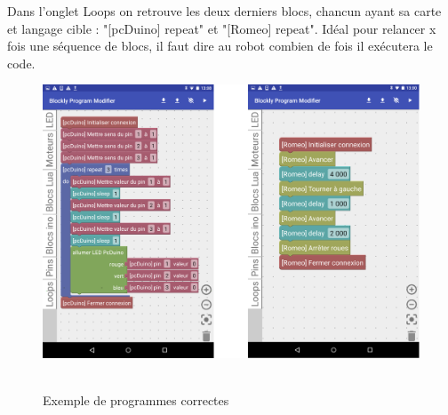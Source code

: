 \documentclass[12pt,francais]{report}
\begin{document}
Dans l'onglet Loops on retrouve les deux derniers blocs, chancun ayant sa carte et langage cible : "[pcDuino] repeat" et "[Romeo] repeat". Idéal pour relancer x fois une séquence de blocs, il faut dire au robot combien de fois il exécutera le code.

\begin{figure}[!h]
\centering
\includegraphics[scale=0.3]{./images/exemplePcDuino.png}~\\[1.5cm]
\caption{Exemple de programmes correctes}
\end{figure}
\end{document}
